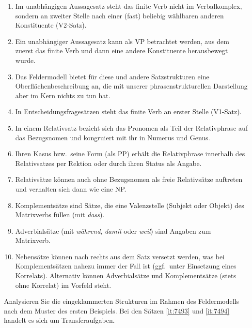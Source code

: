 \begin{enumerate}\Lf
  \item Im unabhängigen Aussagesatz steht das finite Verb nicht im Verbalkomplex, sondern an zweiter Stelle nach einer (fast) beliebig wählbaren anderen Konstituente (V2-Satz).
  \item Ein unabhängiger Aussagesatz kann als VP betrachtet werden, aus dem zuerst das finite Verb und dann eine andere Konstituente herausbewegt wurde.
  \item Das Feldermodell bietet für diese und andere Satzstrukturen eine Oberflächenbeschreibung an, die mit unserer phrasenstrukturellen Darstellung aber im Kern nichts zu tun hat.
  \item In Entscheidungsfragesätzen steht das finite Verb an erster Stelle (V1-Satz).
  \item In einem Relativsatz bezieht sich das Pronomen als Teil der Relativphrase auf das Bezugsnomen und kongruiert mit ihr in Numerus und Genus.
  \item Ihren Kasus bzw.\ seine Form (\zB als PP) erhält die Relativphrase innerhalb des Relativsatzes per Rektion oder durch ihren Status als Angabe.
  \item Relativsätze können auch ohne Bezugsnomen als freie Relativsätze auftreten und verhalten sich dann wie eine NP.
  \item Komplementsätze sind Sätze, die eine Valenzstelle (Subjekt oder Objekt) des Matrixverbs füllen (\zB mit \textit{dass}).
  \item Adverbialsätze (\zB mit \textit{während}, \textit{damit} oder \textit{weil}) sind Angaben zum Matrixverb.
  \item Nebensätze können nach rechts aus dem Satz versetzt werden, was bei Komplementsätzen nahezu immer der Fall ist (ggf.\ unter Einsetzung eines Korrelats).
    Alternativ können Adverbialsätze und Komplementsätze (stets ohne Korrelat) im Vorfeld steht.
\end{enumerate}

\Uebungen

\Uebung \label{u121} Analysieren Sie die eingeklammerten Strukturen im Rahmen des Feldermodells nach dem Muster des ersten Beispiels.
Bei den Sätzen \ref{it:7493} und \ref{it:7494} handelt es sich um Transferaufgaben.

